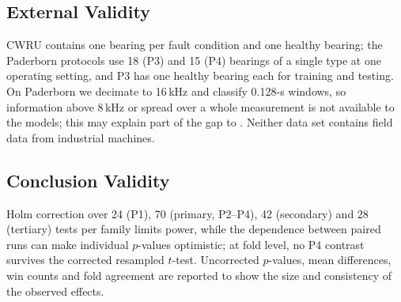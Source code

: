 \documentclass[conference]{IEEEtran}
\begin{document}
\subsection{External Validity}
CWRU contains one bearing per fault condition and one healthy bearing; the Paderborn protocols use 18 (P3) and 15 (P4) bearings of a single type at one operating setting, and P3 has one healthy bearing each for training and testing. On Paderborn we decimate to 16\,kHz and classify 0.128-s windows, so information above 8\,kHz or spread over a whole measurement is not available to the models; this may explain part of the gap to \cite{lessmeier2016kat}. Neither data set contains field data from industrial machines.

\subsection{Conclusion Validity}
Holm correction over 24 (P1), 70 (primary, P2--P4), 42 (secondary) and 28 (tertiary) tests per family limits power, while the dependence between paired runs can make individual $p$-values optimistic; at fold level, no P4 contrast survives the corrected resampled $t$-test. Uncorrected $p$-values, mean differences, win counts and fold agreement are reported to show the size and consistency of the observed effects.

\end{document}
